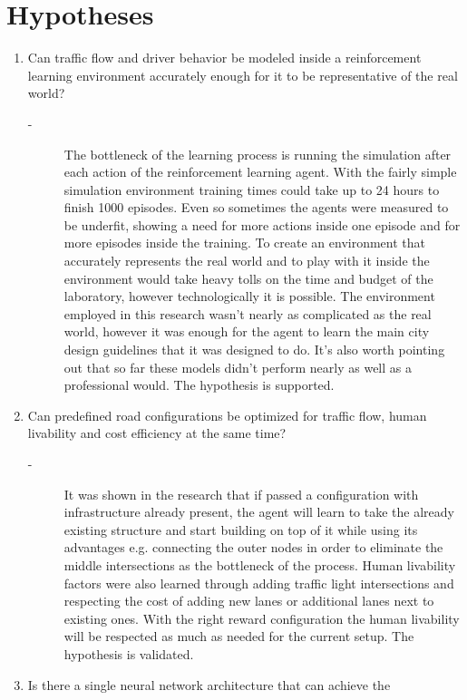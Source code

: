 \documentclass[
]{elteikthesis}[2023/04/10]
\begin{document}
\section*{Hypotheses}
\begin{enumerate}
\item Can traffic flow and driver behavior be modeled inside a reinforcement
learning environment accurately enough for it to be representative
of the real world?
\begin{description}
\item [{-}] The bottleneck of the learning process is running the simulation
after each action of the reinforcement learning agent. With the fairly
simple simulation environment training times could take up to 24 hours
to finish 1000 episodes. Even so sometimes the agents were measured
to be underfit, showing a need for more actions inside one episode
and for more episodes inside the training. To create an environment
that accurately represents the real world and to play with it inside
the environment would take heavy tolls on the time and budget of the
laboratory, however technologically it is possible. The environment
employed in this research wasn't nearly as complicated as the real
world, however it was enough for the agent to learn the main city
design guidelines that it was designed to do. It's also worth pointing out 
that so far these models didn't perform nearly as well as a professional would. 
The hypothesis is supported. 
\end{description}
\item Can predefined road configurations be optimized for traffic flow,
human livability and cost efficiency at the same time? 
\begin{description}
\item [{-}] It was shown in the research that if passed a configuration
with infrastructure already present, the agent will learn to take
the already existing structure and start building on top of it while
using its advantages e.g. connecting the outer nodes in order to eliminate
the middle intersections as the bottleneck of the process. Human livability
factors were also learned through adding traffic light intersections
and respecting the cost of adding new lanes or additional lanes next
to existing ones. With the right reward configuration the human livability
will be respected as much as needed for the current setup. The hypothesis
is validated.
\end{description}
\item Is there a single neural network architecture that can achieve the

\end{enumerate}
\end{document}
